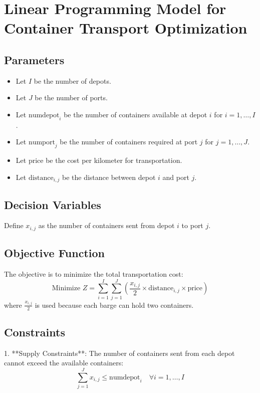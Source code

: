 \documentclass{article}
\begin{document}
\section*{Linear Programming Model for Container Transport Optimization}

\subsection*{Parameters}
\begin{itemize}
    \item Let \( I \) be the number of depots.
    \item Let \( J \) be the number of ports.
    \item Let \( \text{numdepot}_i \) be the number of containers available at depot \( i \) for \( i = 1, \ldots, I \).
    \item Let \( \text{numport}_j \) be the number of containers required at port \( j \) for \( j = 1, \ldots, J \).
    \item Let \( \text{price} \) be the cost per kilometer for transportation.
    \item Let \( \text{distance}_{i,j} \) be the distance between depot \( i \) and port \( j \).
\end{itemize}

\subsection*{Decision Variables}
Define \( x_{i,j} \) as the number of containers sent from depot \( i \) to port \( j \).

\subsection*{Objective Function}
The objective is to minimize the total transportation cost:
\[
\text{Minimize } Z = \sum_{i=1}^{I} \sum_{j=1}^{J} \left( \frac{x_{i,j}}{2} \times \text{distance}_{i,j} \times \text{price} \right)
\]
where \( \frac{x_{i,j}}{2} \) is used because each barge can hold two containers.

\subsection*{Constraints}
1. **Supply Constraints**: The number of containers sent from each depot cannot exceed the available containers:
\[
\sum_{j=1}^{J} x_{i,j} \leq \text{numdepot}_{i} \quad \forall i = 1, \ldots, I
\]
\end{document}
